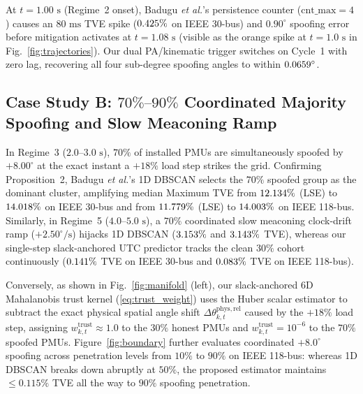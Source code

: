 \documentclass[journal,twoside]{IEEEtran}
\begin{document}
At $t = 1.00\text{~s}$ (Regime~2 onset), Badugu \emph{et al.}'s persistence counter ($\mathrm{cnt\_max}=4$) causes an $80\text{~ms}$ TVE spike ($0.425\%$ on IEEE 30-bus) and $0.90^\circ$ spoofing error before mitigation activates at $t = 1.08\text{~s}$ (visible as the orange spike at $t = 1.0\text{~s}$ in Fig.~\ref{fig:trajectories}). Our dual PA/kinematic trigger switches on Cycle~1 with zero lag, recovering all four sub-degree spoofing angles to within $0.0659^\circ$.

\subsection{Case Study B: $70\%\text{--}90\%$ Coordinated Majority Spoofing and Slow Meaconing Ramp}
In Regime~3 ($2.0\text{--}3.0\text{~s}$), $70\%$ of installed PMUs are simultaneously spoofed by $+8.00^\circ$ at the exact instant a $+18\%$ load step strikes the grid. Confirming Proposition~2, Badugu \emph{et al.}'s 1D DBSCAN selects the $70\%$ spoofed group as the dominant cluster, amplifying median Maximum TVE from $12.134\%$ (LSE) to $14.018\%$ on IEEE 30-bus and from $11.779\%$ (LSE) to $14.003\%$ on IEEE 118-bus. Similarly, in Regime~5 ($4.0\text{--}5.0\text{~s}$), a $70\%$ coordinated slow meaconing clock-drift ramp ($+2.50^\circ/\text{s}$) hijacks 1D DBSCAN ($3.153\%$ and $3.143\%$ TVE), whereas our single-step slack-anchored UTC predictor tracks the clean $30\%$ cohort continuously ($0.141\%$ TVE on IEEE 30-bus and $0.083\%$ TVE on IEEE 118-bus).

Conversely, as shown in Fig.~\ref{fig:manifold} (left), our slack-anchored 6D Mahalanobis trust kernel (\ref{eq:trust_weight}) uses the Huber scalar estimator to subtract the exact physical spatial angle shift $\Delta\theta_{k,t}^{\mathrm{phys,rel}}$ caused by the $+18\%$ load step, assigning $w_{k,t}^{\mathrm{trust}} \approx 1.0$ to the $30\%$ honest PMUs and $w_{k,t}^{\mathrm{trust}} = 10^{-6}$ to the $70\%$ spoofed PMUs. Figure~\ref{fig:boundary} further evaluates coordinated $+8.0^\circ$ spoofing across penetration levels from $10\%$ to $90\%$ on IEEE 118-bus: whereas 1D DBSCAN breaks down abruptly at $50\%$, the proposed estimator maintains $\le 0.115\%$ TVE all the way to $90\%$ spoofing penetration.
\end{document}
